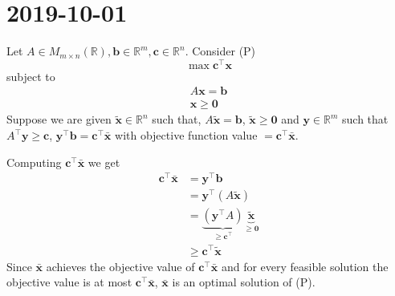 \section{2019-10-01}
Let $A\in M_{m\times n}(\mathbb{R}), \mathbf{b}\in\mathbb{R}^m, \mathbf{c}\in\mathbb{R}^n$.
Consider (P)
\[\max \mathbf{c}^\top \mathbf{x}\]
subject to
\begin{align*}
    A\mathbf{x}=\mathbf{b}\\
    \mathbf{x}\ge\mathbf{0}
\end{align*}
Suppose we are given
$\mathbf{\tilde{x}}\in\mathbb{R}^n$ such that, $A\mathbf{\tilde{x}}=\mathbf{b}$,
$\mathbf{\tilde{x}}\ge\mathbf{0}$
and
$\mathbf{y}\in\mathbb{R}^m$ such that $A^\top \mathbf{y}\ge\mathbf{c}$,
$\mathbf{y}^\top \mathbf{b}=\mathbf{c}^\top \mathbf{\bar{x}}$ with objective function
value $=\mathbf{c}^\top \mathbf{\bar{x}}$.


Computing $\mathbf{c}^\top \mathbf{\bar{x}}$ we get
\begin{align*}
    \mathbf{c}^\top \mathbf{\bar{x}}&=\mathbf{y}^\top \mathbf{b}\\
    &=\mathbf{y}^\top (A\mathbf{\tilde{x}})\\
    &=
    \underbrace{(\mathbf{y}^\top A)}_{\ge \mathbf{c}^\top }
    \underbrace{\mathbf{\tilde{x}}}_{\ge \mathbf{0}}\\
    &\ge \mathbf{c}^\top \mathbf{\tilde{x}}
\end{align*}
Since $\mathbf{\bar{x}}$ achieves the objective value of 
$\mathbf{c}^\top \mathbf{\bar{x}}$ and for every feasible solution the objective
value is at most $\mathbf{c}^\top \mathbf{\bar{x}}$, $\mathbf{\bar{x}}$ is an
optimal solution of (P).

